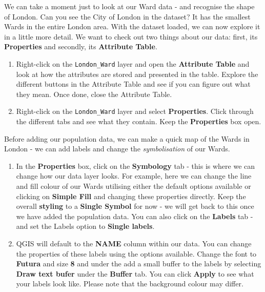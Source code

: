 \documentclass[
]{book}
\providecommand{\tightlist}{%
  \setlength{\itemsep}{0pt}\setlength{\parskip}{0pt}}
\begin{document}
We can take a moment just to look at our Ward data - and recognise the shape of London. Can you see the City of London in the dataset? It has the smallest Wards in the entire London area. With the dataset loaded, we can now explore it in a little more detail. We want to check out two things about our data: first, its \textbf{Properties} and secondly, its \textbf{Attribute Table}.

\begin{enumerate}
\def\labelenumi{\arabic{enumi}.}
\setcounter{enumi}{3}
\tightlist
\item
  Right-click on the \texttt{London\_Ward} layer and open the \textbf{Attribute Table} and look at how the attributes are stored and presented in the table. Explore the different buttons in the Attribute Table and see if you can figure out what they mean. Once done, close the Attribute Table.
\item
  Right-click on the \texttt{London\_Ward} layer and select \textbf{Properties}. Click through the different tabs and see what they contain. Keep the \textbf{Properties} box open.
\end{enumerate}

Before adding our population data, we can make a quick map of the Wards in London - we can add labels and change the \emph{symbolisation} of our Wards.

\begin{enumerate}
\def\labelenumi{\arabic{enumi}.}
\setcounter{enumi}{5}
\item
  In the \textbf{Properties} box, click on the \textbf{Symbology} tab - this is where we can change how our data layer looks. For example, here we can change the line and fill colour of our Wards utilising either the default options available or clicking on \textbf{Simple Fill} and changing these properties directly. Keep the overall \textbf{styling} to a \textbf{Single Symbol} for now - we will get back to this once we have added the population data. You can also click on the \textbf{Labels} tab - and set the Labels option to \textbf{Single labels}.
\item
  QGIS will default to the \textbf{NAME} column within our data. You can change the properties of these labels using the options available. Change the font to \textbf{Futura} and size \textbf{8} and under the add a small buffer to the labels by selecting \textbf{Draw text bufer} under the \textbf{Buffer} tab. You can click \textbf{Apply} to see what your labels look like. Please note that the background colour may differ.
\end{enumerate}
\end{document}

